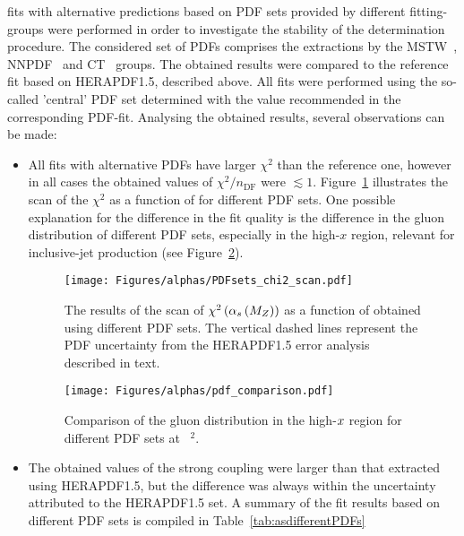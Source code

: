 \asz fits with alternative predictions based on PDF sets provided by different fitting-groups were performed in order to investigate the stability of the \asz determination procedure. The considered set of PDFs comprises the extractions by the MSTW~\cite{}, NNPDF~\cite{} and CT~\cite{} groups. The obtained results were compared to the reference fit based on HERAPDF1.5, described above. All fits were performed using the so-called 'central' PDF set determined with the \asz value recommended in the corresponding PDF-fit. Analysing the obtained results, several observations can be made:
\begin{itemize}
 \item All fits with alternative PDFs have larger $\chi^2$ than the reference one, however in all cases the obtained values of $\chi^2/n_\text{DF}$ were $\lesssim 1$. Figure~\ref{fig:chi2scanpdf} illustrates the scan of the $\chi^2$ as a function of \asz for different PDF sets. One possible explanation for the difference in the fit quality is the difference in the gluon distribution of different PDF sets, especially in the high-$x$ region, relevant for inclusive-jet production (see Figure~\ref{fig:pdf_gluon_comp}).
\begin{figure}[t]
 \centering
 \texttt{[image: Figures/alphas/PDFsets\_chi2\_scan.pdf]}
 \caption{The results of the scan of $\chi^2\left(\mbox{$\alpha_{s}\left(M_{Z}\right)$}\right)$ as a function of \asz obtained using different PDF sets. The vertical dashed lines represent the PDF uncertainty from the HERAPDF1.5 error analysis described in text.}
 \label{fig:chi2scanpdf}
\end{figure}
\begin{figure}[ht]
 \centering
 \texttt{[image: Figures/alphas/pdf\_comparison.pdf]}
 \caption{Comparison of the gluon distribution in the high-$\mbox{${x}$}$ region for different PDF sets at ~\GeV$^2$.}
 \label{fig:pdf_gluon_comp}
\end{figure}
 \item The obtained values of the strong coupling were larger than that extracted using HERAPDF1.5, but the difference was always within the uncertainty attributed to the HERAPDF1.5 set. A summary of the fit results based on different PDF sets is compiled in Table~\ref{tab:asdifferentPDFs}
\end{itemize}

